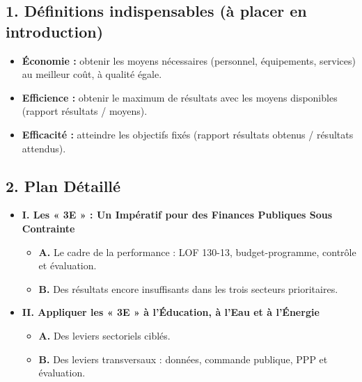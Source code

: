 \subsection*{1. Définitions indispensables (à placer en introduction)}
\begin{itemize}
    \item \textbf{Économie :} obtenir les moyens nécessaires (personnel, équipements, services) au meilleur coût, à qualité égale.
    \item \textbf{Efficience :} obtenir le maximum de résultats avec les moyens disponibles (rapport résultats / moyens).
    \item \textbf{Efficacité :} atteindre les objectifs fixés (rapport résultats obtenus / résultats attendus).
\end{itemize}

\subsection*{2. Plan Détaillé}
\begin{itemize}
    \item \textbf{I. Les « 3E » : Un Impératif pour des Finances Publiques Sous Contrainte}
    \begin{itemize}
        \item \textbf{A.} Le cadre de la performance : LOF 130-13, budget-programme, contrôle et évaluation.
        \item \textbf{B.} Des résultats encore insuffisants dans les trois secteurs prioritaires.
    \end{itemize}
    \item \textbf{II. Appliquer les « 3E » à l'Éducation, à l'Eau et à l'Énergie}
    \begin{itemize}
        \item \textbf{A.} Des leviers sectoriels ciblés.
        \item \textbf{B.} Des leviers transversaux : données, commande publique, PPP et évaluation.
    \end{itemize}
\end{itemize}

